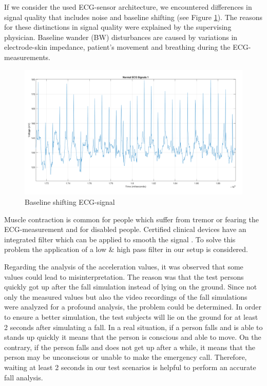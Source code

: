 \documentclass[review]{elsarticle}
\begin{document}
If we consider the used ECG-sensor architecture, we encountered differences in signal quality that includes noise and baseline shifting (see Figure \ref{fig:ECGBaselineShifting}). The reasons for these distinctions in signal quality were explained by the supervising physician. Baseline wander (BW) disturbances are caused by variations in electrode-skin impedance, patient's movement and breathing during the ECG-measurements.
\begin{figure}[!ht]
	\centering
	\includegraphics[scale=0.275]{Images/NormalECG1.png}
	\caption[Measured ECG-signal]{Baseline shifting ECG-signal}
	\label{fig:ECGBaselineShifting}
\end{figure}
 Muscle contraction is common for people which suffer from tremor or fearing the ECG-measurement and for disabled people. Certified clinical devices have an integrated filter which can be applied to smooth the signal \cite{ECGNoise,DrNicoletteWagner}. To solve this problem the application of a low \& high pass filter in our setup is considered.

Regarding the analysis of the acceleration values, it was observed that some values could lead to misinterpretation. The reason was that the test persons quickly got up after the fall simulation instead of lying on the ground.
Since not only the measured values but also the video recordings of the fall simulations were analyzed for a profound analysis, the problem could be determined. In order to ensure a better simulation, the test subjects will lie on the ground for at least 2 seconds after simulating a fall. In a real situation, if a person falls and is able to stands up quickly it means that the person is conscious and able to move. On the contrary, if the person falls and does not get up after a while, it means that the person may be unconscious or unable to make the emergency call.  Therefore, waiting at least 2 seconds in our test scenarios is helpful to perform an accurate fall analysis.
\end{document}
